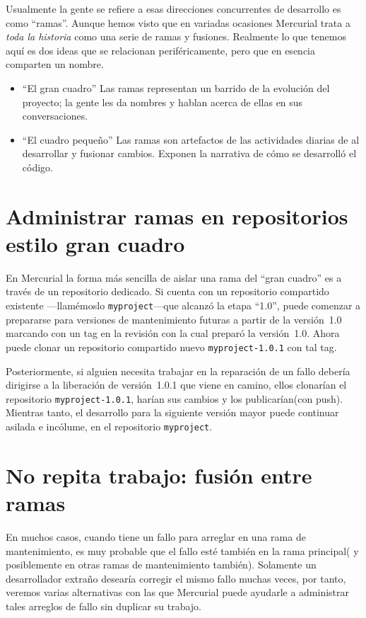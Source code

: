 Usualmente la gente se refiere a esas direcciones
concurrentes de desarrollo es como ``ramas''.  Aunque hemos visto que
en variadas ocasiones Mercurial trata a \emph{toda la historia} como
una serie de ramas y fusiones.  Realmente lo que tenemos aquí es dos
ideas que se relacionan periféricamente, pero que en esencia comparten
un nombre.
\begin{itemize}
\item ``El gran cuadro'' Las ramas representan un barrido de la
  evolución del proyecto; la gente les da nombres y hablan acerca de
  ellas en sus conversaciones.
\item ``El cuadro pequeño'' Las ramas son artefactos de las
  actividades diarias de al desarrollar y fusionar cambios. Exponen la
  narrativa de cómo se desarrolló el código.
\end{itemize}

\section{Administrar ramas en repositorios estilo gran cuadro}

En Mercurial la forma más sencilla de aislar una rama del ``gran
cuadro'' es a través de un repositorio dedicado.  Si cuenta con un
repositorio compartido existente ---llamémoslo
\texttt{myproject}---que alcanzó la etapa ``1.0'', puede comenzar a
prepararse para versiones de mantenimiento futuras a partir de la
versión~1.0 marcando con un tag en la revisión con la cual preparó la versión~1.0.
Ahora puede clonar un repositorio compartido nuevo
\texttt{myproject-1.0.1} con tal tag.

Posteriormente, si alguien necesita trabajar en la reparación de un
fallo debería dirigirse a la liberación de versión~1.0.1 que viene en
camino, ellos clonarían el repositorio \texttt{myproject-1.0.1},
harían sus cambios y los publicarían(con push).
Mientras tanto, el desarrollo para la siguiente versión mayor puede
continuar asilada e incólume, en el repositorio \texttt{myproject}.

\section{No repita trabajo: fusión entre ramas}

En muchos casos, cuando tiene un fallo para arreglar en una rama de
mantenimiento, es muy probable que el fallo esté también en la rama
principal( y posiblemente en otras ramas de mantenimiento
también). Solamente un desarrollador extraño desearía corregir el
mismo fallo muchas veces, por tanto, veremos varias alternativas con
las que Mercurial puede ayudarle a administrar tales arreglos de fallo
sin duplicar su trabajo.

